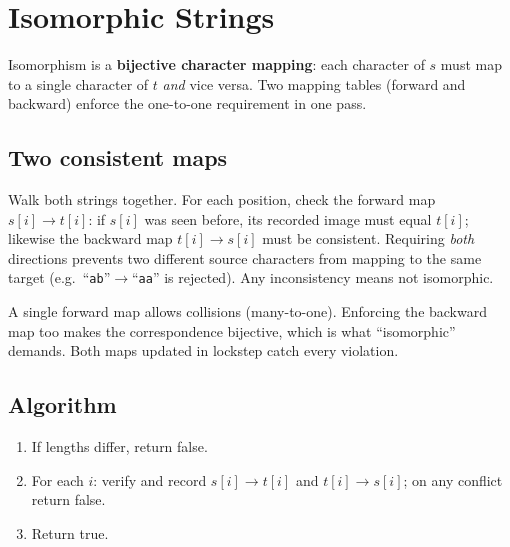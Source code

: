 \section{Isomorphic Strings}
\label{sec:str-isomorphic}


\begin{patternbox}
Isomorphism is a \textbf{bijective character mapping}: each character of $s$
must map to a single character of $t$ \emph{and} vice versa. Two mapping
tables (forward and backward) enforce the one-to-one requirement in one
pass.
\end{patternbox}

\subsection*{Two consistent maps}

Walk both strings together. For each position, check the forward map
$s[i]\to t[i]$: if $s[i]$ was seen before, its recorded image must equal
$t[i]$; likewise the backward map $t[i]\to s[i]$ must be consistent.
Requiring \emph{both} directions prevents two different source characters
from mapping to the same target (e.g.\ ``\texttt{ab}''$\to$``\texttt{aa}''
is rejected). Any inconsistency means not isomorphic.

\begin{ideabox}
A single forward map allows collisions (many-to-one). Enforcing the
backward map too makes the correspondence bijective, which is what
``isomorphic'' demands. Both maps updated in lockstep catch every
violation.
\end{ideabox}

\subsection*{Algorithm}

\begin{enumerate}
  \item If lengths differ, return false.
  \item For each $i$: verify and record $s[i]\to t[i]$ and $t[i]\to s[i]$;
        on any conflict return false.
  \item Return true.
\end{enumerate}

